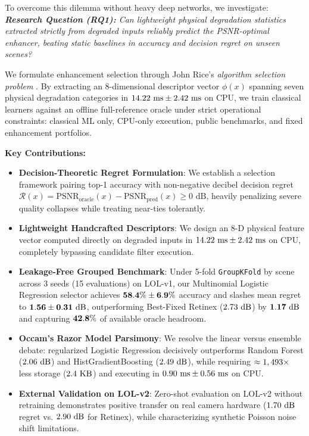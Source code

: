 \documentclass[journal]{IEEEtran}
\begin{document}
To overcome this dilemma without heavy deep networks, we investigate:
\noindent\textit{\textbf{Research Question (RQ1):} Can lightweight physical degradation statistics extracted strictly from degraded inputs reliably predict the PSNR-optimal enhancer, beating static baselines in accuracy and decision regret on unseen scenes?}

We formulate enhancement selection through John Rice's \textit{algorithm selection problem} \cite{rice1976algorithm}. By extracting an 8-dimensional descriptor vector $\phi(x)$ spanning seven physical degradation categories in $14.22\text{ ms} \pm 2.42\text{ ms}$ on CPU, we train classical learners against an offline full-reference oracle under strict operational constraints: classical ML only, CPU-only execution, public benchmarks, and fixed enhancement portfolios.

\noindent\textbf{Key Contributions:}
\begin{itemize}
    \setlength{\itemsep}{1pt}
    \setlength{\parskip}{0pt}
    \item \textbf{Decision-Theoretic Regret Formulation}: We establish a selection framework pairing top-1 accuracy with non-negative decibel decision regret $\mathcal{R}(x) = \text{PSNR}_{\text{oracle}}(x) - \text{PSNR}_{\text{pred}}(x) \ge 0\text{ dB}$, heavily penalizing severe quality collapses while treating near-ties tolerantly.
    \item \textbf{Lightweight Handcrafted Descriptors}: We design an 8-D physical feature vector computed directly on degraded inputs in $14.22\text{ ms} \pm 2.42\text{ ms}$ on CPU, completely bypassing candidate filter execution.
    \item \textbf{Leakage-Free Grouped Benchmark}: Under 5-fold \texttt{GroupKFold} by scene across 3 seeds (15 evaluations) on LOL-v1, our Multinomial Logistic Regression selector achieves $\mathbf{58.4\% \pm 6.9\%}$ accuracy and slashes mean regret to $\mathbf{1.56 \pm 0.31\text{ dB}}$, outperforming Best-Fixed Retinex ($2.73\text{ dB}$) by $\mathbf{1.17\text{ dB}}$ and capturing $\mathbf{42.8\%}$ of available oracle headroom.
    \item \textbf{Occam's Razor Model Parsimony}: We resolve the linear versus ensemble debate: regularized Logistic Regression decisively outperforms Random Forest ($2.06\text{ dB}$) and HistGradientBoosting ($2.49\text{ dB}$), while requiring $\approx 1,493\times$ less storage ($2.4\text{ KB}$) and executing in $0.90\text{ ms} \pm 0.56\text{ ms}$ on CPU.
    \item \textbf{External Validation on LOL-v2}: Zero-shot evaluation on LOL-v2 without retraining demonstrates positive transfer on real camera hardware ($1.70\text{ dB}$ regret vs. $2.90\text{ dB}$ for Retinex), while characterizing synthetic Poisson noise shift limitations.
\end{itemize}
\end{document}

